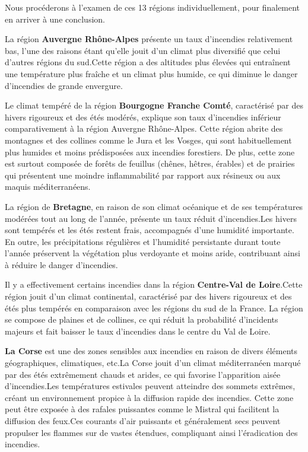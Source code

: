 \documentclass[
]{article}
\begin{document}
Nous procéderons à l'examen de ces 13 régions individuellement, pour
finalement en arriver à une conclusion.

La région \textbf{Auvergne Rhône-Alpes} présente un taux d'incendies
relativement bas, l'une des raisons étant qu'elle jouit d'un climat plus
diversifié que celui d'autres régions du sud.Cette région a des
altitudes plus élevées qui entraînent une température plus fraîche et un
climat plus humide, ce qui diminue le danger d'incendies de grande
envergure.

Le climat tempéré de la région \textbf{Bourgogne Franche Comté},
caractérisé par des hivers rigoureux et des étés modérés, explique son
taux d'incendies inférieur comparativement à la région Auvergne
Rhône-Alpes. Cette région abrite des montagnes et des collines comme le
Jura et les Vosges, qui sont habituellement plus humides et moins
prédisposées aux incendies forestiers. De plus, cette zone est surtout
composée de forêts de feuillus (chênes, hêtres, érables) et de prairies
qui présentent une moindre inflammabilité par rapport aux résineux ou
aux maquis méditerranéens.

La région de \textbf{Bretagne}, en raison de son climat océanique et de
ses températures modérées tout au long de l'année, présente un taux
réduit d'incendies.Les hivers sont tempérés et les étés restent frais,
accompagnés d'une humidité importante. En outre, les précipitations
régulières et l'humidité persistante durant toute l'année préservent la
végétation plus verdoyante et moins aride, contribuant ainsi à réduire
le danger d'incendies.

Il y a effectivement certains incendies dans la région
\textbf{Centre-Val de Loire}.Cette région jouit d'un climat continental,
caractérisé par des hivers rigoureux et des étés plus tempérés en
comparaison avec les régions du sud de la France. La région se compose
de plaines et de collines, ce qui réduit la probabilité d'incidents
majeurs et fait baisser le taux d'incendies dans le centre du Val de
Loire.

\textbf{La Corse} est une des zones sensibles aux incendies en raison de
divers éléments géographiques, climatiques, etc.La Corse jouit d'un
climat méditerranéen marqué par des étés extrêmement chauds et arides,
ce qui favorise l'apparition aisée d'incendies.Les températures
estivales peuvent atteindre des sommets extrêmes, créant un
environnement propice à la diffusion rapide des incendies. Cette zone
peut être exposée à des rafales puissantes comme le Mistral qui
facilitent la diffusion des feux.Ces courants d'air puissants et
généralement secs peuvent propulser les flammes sur de vastes étendues,
compliquant ainsi l'éradication des incendies.
\end{document}
